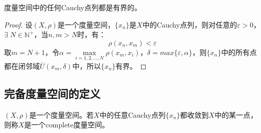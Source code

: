 \begin{theorem}
	度量空间中的任何Cauchy点列都是有界的。
\end{theorem}
\begin{proof}
	设$(X,\rho)$是一个度量空间，$\{x_n\}$是$X$中的Cauchy点列，则对任意的$\varepsilon>0$，$\exists\;N\in\mathbb{N}^+$，当$n,m>N$时，有：
	\begin{equation*}
		\rho(x_n,x_m)<\varepsilon
	\end{equation*}
	取$m=N+1$，令$\alpha=\max\limits_{i=1,2,\dots,N}\rho(x_m,x_i)$，$\delta=max\{\varepsilon,\alpha\}$，则$\{x_n\}$中的所有点都在闭邻域$\overline{U}(x_m,\delta)$中，所以$\{x_n\}$有界。
\end{proof}

\subsection{完备度量空间的定义}
\begin{definition}
	$(X,\rho)$是一个度量空间。若$X$中的任意Cauchy点列$\{x_n\}$都收敛到$X$中的某一点，则称$X$是一个\gls{complete}度量空间。
\end{definition}
